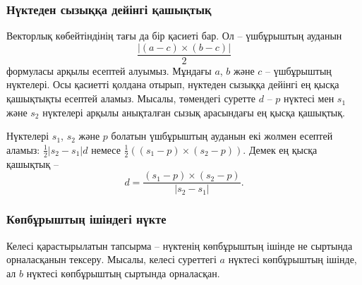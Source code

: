 \subsubsection{Нүктеден сызыққа дейінгі қашықтық}

Векторлық көбейтіндінің тағы да бір қасиеті бар. Ол --
үшбұрыштың ауданын 
\[\frac{| (a-c) \times (b-c) |}{2}\]
формуласы арқылы есептей алуымыз. Мұндағы $a$, $b$ және $c$ -- үшбұрыштың нүктелері.
Осы қасиетті қолдана отырып, 
нүктеден сызыққа дейінгі ең қысқа қашықтықты
есептей аламыз. Мысалы, төмендегі суретте $d$ --
$p$ нүктесі мен $s_1$ және $s_2$ нүктелері арқылы анықталған
сызық арасындағы ең қысқа қашықтық. 

\begin{center}
\end{center}

Нүктелері $s_1$, $s_2$ және $p$ болатын үшбұрыштың
ауданын екі жолмен есептей аламыз:
$\frac{1}{2} |s_2-s_1| d$ немесе $\frac{1}{2} ((s_1-p) \times (s_2-p))$.
Демек ең қысқа қашықтық --
\[ d = \frac{(s_1-p) \times (s_2-p)}{|s_2-s_1|} .\]


\subsubsection{Көпбұрыштың ішіндегі нүкте}

Келесі қарастырылатын тапсырма -- нүктенің көпбұрыштың
ішінде не сыртында орналасқанын тексеру. Мысалы,
келесі суреттегі $a$ нүктесі көпбұрыштың ішінде, ал $b$ нүктесі көпбұрыштың сыртында орналасқан.

